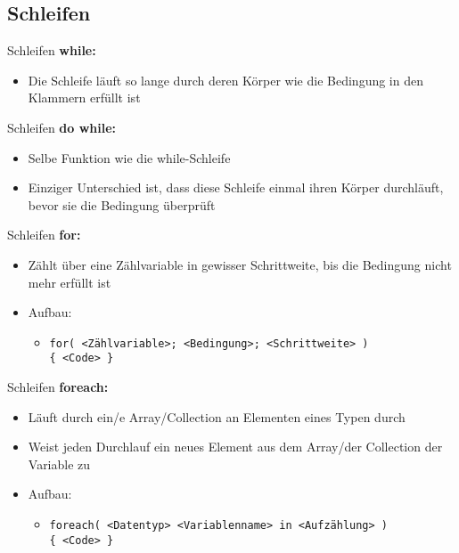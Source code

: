 \subsection{Schleifen}
\begin{frame}{Schleifen}
	\textbf{while:} \\
	\begin{itemize}
		\item Die Schleife läuft so lange durch deren Körper wie die Bedingung in den Klammern erfüllt ist
	\end{itemize}
		
\end{frame}

\begin{frame}{Schleifen}
	\textbf{do while:} \\
	\begin{itemize}
		\item Selbe Funktion wie die while-Schleife
		\item Einziger Unterschied ist, dass diese Schleife einmal ihren Körper durchläuft, bevor sie die Bedingung überprüft
	\end{itemize}
		
\end{frame}

\begin{frame}{Schleifen}
	\textbf{for:} \\
	\begin{itemize}
		\item Zählt über eine Zählvariable in gewisser Schrittweite, bis die Bedingung nicht mehr erfüllt ist
		\item Aufbau:
		\begin{itemize}
			\item \alert{\texttt{for( <Zählvariable>; <Bedingung>; <Schrittweite> ) \\ \{ <Code> \} }}
		\end{itemize}
	\end{itemize}
		
\end{frame}

\begin{frame}{Schleifen}
	\textbf{foreach:} \\
	\begin{itemize}
		\item Läuft durch ein/e Array/Collection an Elementen eines Typen durch 
		\item Weist jeden Durchlauf ein neues Element aus dem Array/der Collection der Variable zu 
		\item Aufbau:
		\begin{itemize}
			\item \alert{\texttt{foreach( <Datentyp> <Variablenname> in <Aufzählung> )  \\ \{ <Code> \}}}
		\end{itemize}
	\end{itemize}
		
\end{frame}


